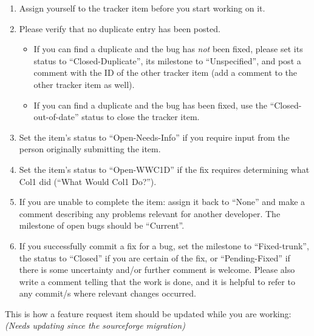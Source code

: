\documentclass[12pt]{book}
\begin{document}
\begin{enumerate}
\item Assign yourself to the tracker item before you start working on it.

\item Please verify that no duplicate entry has been posted.

\begin{itemize}
\item If you can find a duplicate and the bug has \emph{not} been
  fixed, please set its status to ``Closed-Duplicate'', its milestone
  to ``Unspecified'', and post a comment with the ID of the other
  tracker item (add a comment to the other tracker item as well).

\item If you can find a duplicate and the bug has been fixed, use the
  ``Closed-out-of-date'' status to close the tracker item.
\end{itemize}

\item Set the item's status to ``Open-Needs-Info'' if you require
  input from the person originally submitting the item.

\item Set the item's status to ``Open-WWC1D'' if the fix requires
  determining what Col1 did (``What Would Col1 Do?'').

\item If you are unable to complete the item: assign it back to
  ``None'' and make a comment describing any problems relevant for
  another developer.  The milestone of open bugs should be ``Current''.

\item If you successfully commit a fix for a bug, set the milestone to
  ``Fixed-trunk'', the status to ``Closed'' if you are certain of the
  fix, or ``Pending-Fixed'' if there is some uncertainty and/or
  further comment is welcome.  Please also write a comment telling
  that the work is done, and it is helpful to refer to any commit/s
  where relevant changes occurred.
\end{enumerate}


This is how a feature request item should be updated while you are
working:\emph{(Needs updating since the sourceforge migration)}
\end{document}
